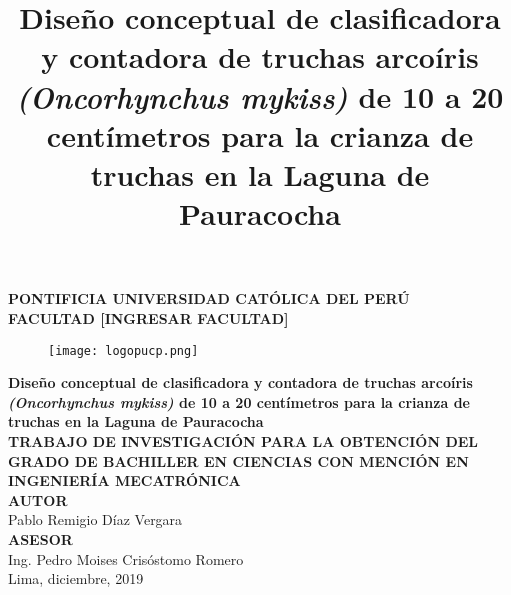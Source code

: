 \clearpage{\pagestyle{empty}\cleardoublepage}
\begin{titlepage}
\begin{center}
 {\Large \bf PONTIFICIA UNIVERSIDAD CATÓLICA DEL PERÚ}\\
  \vspace{0.8 cm} 
  {\Large \bf FACULTAD [INGRESAR FACULTAD]}\\
  \vspace{1.75 cm}
 \begin{figure}[H]
    \centering
    \texttt{[image: logopucp.png]}
\end{figure}
  \vspace{0.25cm}

\title{Diseño conceptual de clasificadora y contadora de truchas arcoíris \textit{(Oncorhynchus mykiss)} de 10 a 20 centímetros para la crianza de truchas en la Laguna de Pauracocha} %
{\Large \bf Diseño conceptual de clasificadora y contadora de truchas arcoíris \textit{(Oncorhynchus mykiss)} de 10 a 20 centímetros para la crianza de truchas en la Laguna de Pauracocha}\\ %
\vspace{0.5cm}
{\Large \bf TRABAJO DE INVESTIGACIÓN PARA LA OBTENCIÓN DEL GRADO DE BACHILLER EN CIENCIAS CON MENCIÓN EN INGENIERÍA MECATRÓNICA}\\[1.5 cm]
{\large \bf AUTOR}\\[0.5cm]
{\large Pablo Remigio Díaz Vergara}\\[1.25 cm] %
{\large \bf ASESOR}\\[0.5 cm] 
{\large Ing. Pedro Moises Crisóstomo Romero}\\[0.5 cm] %
\vspace{1.75 cm}
{\large Lima, diciembre, 2019}

\end{center}
\end{titlepage}